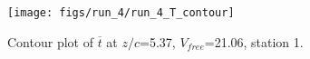 \begin{figure}[H]
\centering
\texttt{[image: figs/run\_4/run\_4\_T\_contour]}
\caption{Contour plot of $\overline{t}$ at $z/c$=5.37, $V_{free}$=21.06, station 1.}
\label{fig:run_4_T_contour}
\end{figure}


